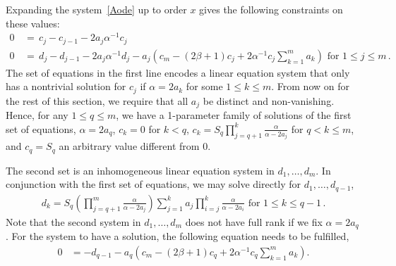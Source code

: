 \documentclass[oneside]{amsart}
\theoremstyle{definition}
\begin{document}
Expanding the system~\eqref{Aode} up to order $x$ gives the following constraints on these values:
%
%
%
%
\begin{align*} 0 &\,=\, c_j - c_{j-1} - 2 a_j \alpha^{-1} c_j \\
0 &\,=\, d_j - d_{j-1} - 2 a_j \alpha^{-1} d_j - a_j \left( c_m - (2 \beta+1) c_j + 2 \alpha^{-1} c_j \sum_{k=1}^m a_k\right) \text{ for } 1 \leq j \leq m\,. \end{align*}
%
%
%
%
%
%
%
%
%
%
%
%
%
%
%
%
%
%
The set of equations in the first line encodes a linear equation system that only has a nontrivial solution for $c_j$ if $\alpha = 2 a_k$ for some $1 \leq k \leq m$. 
From now on for the rest of this section, we require that all $a_j$ be distinct and non-vanishing. Hence, for any $1\leq q \leq m$, we have a 1-parameter family of solutions of the first set of equations,
$\alpha = 2 a_q$, $c_k =0$ for $k < q$, 
$c_k = S_q \prod_{j=q+1}^k\frac{\alpha}{\alpha-2 a_j}$ for $q < k \leq m$, and $c_q = S_q$ an arbitrary value different from $0$.

The second set is an inhomogeneous linear equation system in $d_1, \ldots, d_m$. 
In conjunction with the first set of equations, we may solve directly for $d_1,\ldots,d_{q-1}$,
\begin{align*}      d_k = S_q \left( \prod_{j=q+1}^m\frac{\alpha}{\alpha-2 a_j} \right) \sum_{j=1}^k a_j \prod_{i=j}^{k} \frac{\alpha}{\alpha-2a_i} \text{ for } 1 \leq k \leq q-1\,. \end{align*}
Note that the second system in $d_1,\ldots,d_m$ does not have full rank if we fix $\alpha = 2a_q$.
For the system to have a solution, 
the following equation needs to be fulfilled,
\begin{align} \label{beta_eq} 0 &= - d_{q-1} - a_q \left( c_m - (2 \beta+1) c_q + 2 \alpha^{-1} c_q \sum_{k=1}^m a_k\right). \end{align}
\end{document}
